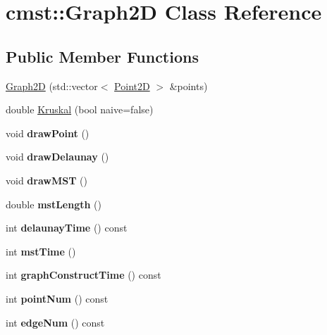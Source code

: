 \hypertarget{classcmst_1_1_graph2_d}{}\section{cmst\+:\+:Graph2D Class Reference}
\label{classcmst_1_1_graph2_d}
\subsection*{Public Member Functions}
\begin{DoxyCompactItemize}
\item 
\hyperlink{classcmst_1_1_graph2_d_a36cf583f9e2e59da2bed94c8569914d2}{Graph2D} (std\+::vector$<$ \hyperlink{classcmst_1_1_point2_d}{Point2D} $>$ \&points)
\item 
double \hyperlink{classcmst_1_1_graph2_d_ac3ce0434f4c42c2ed2b7c7861b32710f}{Kruskal} (bool naive=false)
\item 
void {\bfseries draw\+Point} ()\hypertarget{classcmst_1_1_graph2_d_affec250ee22a067a28127b46ce976b90}{}\label{classcmst_1_1_graph2_d_affec250ee22a067a28127b46ce976b90}

\item 
void {\bfseries draw\+Delaunay} ()\hypertarget{classcmst_1_1_graph2_d_a2c4ed2ccd1fffc94c636929e531c4e3e}{}\label{classcmst_1_1_graph2_d_a2c4ed2ccd1fffc94c636929e531c4e3e}

\item 
void {\bfseries draw\+M\+ST} ()\hypertarget{classcmst_1_1_graph2_d_a96e388b819b351c8564eed9aecf58f7d}{}\label{classcmst_1_1_graph2_d_a96e388b819b351c8564eed9aecf58f7d}

\item 
double {\bfseries mst\+Length} ()\hypertarget{classcmst_1_1_graph2_d_aea22c23fdbb3b9e91671562cb19730ed}{}\label{classcmst_1_1_graph2_d_aea22c23fdbb3b9e91671562cb19730ed}

\item 
int {\bfseries delaunay\+Time} () const \hypertarget{classcmst_1_1_graph2_d_a93a1d4d5d2dd08796e37bcba6de79341}{}\label{classcmst_1_1_graph2_d_a93a1d4d5d2dd08796e37bcba6de79341}

\item 
int {\bfseries mst\+Time} ()\hypertarget{classcmst_1_1_graph2_d_a3b596946f310f7024036d2c6a18985a3}{}\label{classcmst_1_1_graph2_d_a3b596946f310f7024036d2c6a18985a3}

\item 
int {\bfseries graph\+Construct\+Time} () const \hypertarget{classcmst_1_1_graph2_d_ad4756aa3f617493bd8b3f6ecfe099449}{}\label{classcmst_1_1_graph2_d_ad4756aa3f617493bd8b3f6ecfe099449}

\item 
int {\bfseries point\+Num} () const \hypertarget{classcmst_1_1_graph2_d_a0b18b38d5813b2fdbe8f5a8d6f92575d}{}\label{classcmst_1_1_graph2_d_a0b18b38d5813b2fdbe8f5a8d6f92575d}

\item 
int {\bfseries edge\+Num} () const \hypertarget{classcmst_1_1_graph2_d_ae2474e4dd9964cd18fc9926a296c82fd}{}\label{classcmst_1_1_graph2_d_ae2474e4dd9964cd18fc9926a296c82fd}

\end{DoxyCompactItemize}
